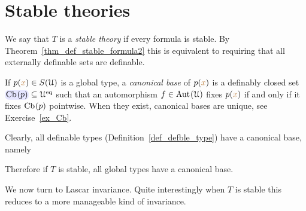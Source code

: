 \documentclass[creche.tex]{subfiles}
\begin{document}













\section{Stable theories}
\label{stable_theories}

We say that $T$ is a \emph{stable theory\/} if every formula is stable. By Theorem~\ref{thm_def_stable_formula2} this is equivalent to requiring that all externally definable sets are definable.

If $p({\color{brown} x})\in S(\EuScript U)$ is a global type, a \emph{canonical base\/} of $p({\color{brown} x})$ is a definably closed set $\emph{$\Cb(p)$}\subseteq \U^\eq$ such that an automorphism $f\in{\rm Aut\kern.15ex}(\EuScript U)$ fixes $p({\color{brown} x})$ if and only if it fixes ${\rm Cb\kern.15ex}(p)$ pointwise. When they exist, canonical bases are unique, see Exercise~\ref{ex_Cb}.

Clearly, all definable types (Definition~\ref{def_defble_type}) have a canonical base, namely


Therefore if $T$ is stable, all global types have a canonical base.

We now turn to Lascar invariance. Quite interestingly when $T$ is stable this reduces to a more manageable kind of invariance.
\end{document}
